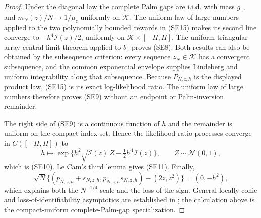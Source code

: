 \begin{proof}
Under the diagonal law the complete Palm gaps are i.i.d. with mass \(g_z\),
and \(m_N(z)/N\to1/\mu_z\) uniformly on \(\mathcal K\).  The uniform law of
large numbers applied
to the two polynomially bounded rewards in \textup{(SE15)} makes its second
line converge to \(-h^4\mathcal I(z)/2\), uniformly on
\(\mathcal K\times[-H,H]\).  The uniform triangular-array central limit theorem
applied to \(b_z\) proves \textup{(SE8)}.  Both results can also be obtained by
the subsequence criterion: every sequence \(z_N\in\mathcal K\) has a
convergent subsequence, and the common exponential envelope supplies
Lindeberg and uniform integrability along that subsequence.  Because
\(P_{N,z,h}\) is the displayed product law, \textup{(SE15)} is its exact
log-likelihood ratio.  The uniform law of large numbers therefore proves
\textup{(SE9)} without an endpoint or Palm-inversion remainder.

The right side of \textup{(SE9)} is a continuous function of \(h\) and the
remainder is uniform on the compact index set.  Hence the likelihood-ratio
processes converge in \(C([-H,H])\) to
\[
 h\longmapsto
 \exp\{h^2\sqrt{\mathcal I(z)}\,Z-\tfrac12h^4\mathcal I(z)\},
 \qquad Z\sim\mathcal N(0,1),
\]
which is \textup{(SE10)}.  Le Cam's third lemma gives \textup{(SE11)}.
Finally,
\[
\sqrt N\{(p_{N,z,h}+s_{N,z,h},p_{N,z,h}s_{N,z,h})
-(2z,z^2)\}=(0,-h^2),
\]
which explains both the \(N^{-1/4}\) scale and the loss of the sign.  General
locally conic and loss-of-identifiability asymptotics are established in
\cite{DacunhaCastelleGassiat1997LocallyConic,
LiuShao2003LossIdentifiability}; the calculation above is the
compact-uniform complete-Palm-gap specialization.
\end{proof}

